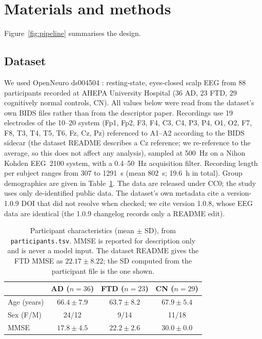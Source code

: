 \section{Materials and methods}\label{sec:methods}
Figure~\ref{fig:pipeline} summarises the design.


\subsection{Dataset}
We used OpenNeuro ds004504 \cite{F1,ds004504}: resting-state, eyes-closed scalp EEG from 88
participants recorded at AHEPA University Hospital (36 AD, 23 FTD, 29 cognitively normal controls,
CN). All values below were read from the dataset's own BIDS files rather than from the descriptor
paper. Recordings use 19 electrodes of the 10--20 system (Fp1, Fp2, F3, F4, C3, C4, P3, P4, O1, O2,
F7, F8, T3, T4, T5, T6, Fz, Cz, Pz) referenced to A1--A2 according to the BIDS sidecar (the dataset README
describes a Cz reference; we re-reference to the average, so this does not affect any analysis), sampled at \SI{500}{\hertz} on a Nihon
Kohden EEG~2100 system, with a 0.4--\SI{50}{\hertz} acquisition filter. Recording length per subject
ranges from \SI{307}{} to \SI{1291}{\second} (mean \SI{802}{\second}; \SI{19.6}{\hour} in total).
Group demographics are given in Table~\ref{tab:demographics}. The data are released under CC0; the
study uses only de-identified public data. The dataset's own metadata cite a version-1.0.9 DOI that
did not resolve when checked; we cite version 1.0.8, whose EEG data are identical (the 1.0.9
changelog records only a README edit).

\begin{table}[t]
\centering\small
\caption{Participant characteristics (mean $\pm$ SD), from \texttt{participants.tsv}. MMSE is
reported for description only and is never a model input. The dataset README gives the FTD MMSE as
$22.17\pm8.22$; the SD computed from the participant file is the one shown.}
\label{tab:demographics}
\begin{tabular}{lccc}
\toprule
 & AD ($n=36$) & FTD ($n=23$) & CN ($n=29$) \\
\midrule
Age (years) & $66.4\pm7.9$ & $63.7\pm8.2$ & $67.9\pm5.4$ \\
Sex (F/M) & 24/12 & 9/14 & 11/18 \\
MMSE & $17.8\pm4.5$ & $22.2\pm2.6$ & $30.0\pm0.0$ \\
\bottomrule
\end{tabular}
\end{table}

